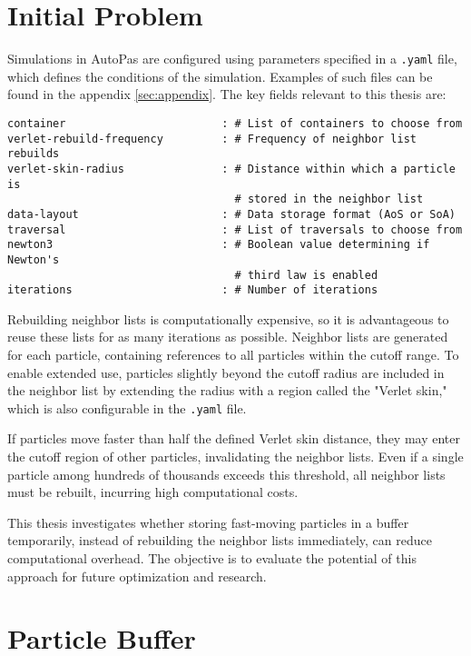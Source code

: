 \section{Initial Problem}
Simulations in AutoPas are configured using parameters specified in a \texttt{.yaml} file, which defines the conditions of the simulation. Examples of such files can be found in the appendix \ref{sec:appendix}. The key fields relevant to this thesis are:

\begin{verbatim}
container                        : # List of containers to choose from
verlet-rebuild-frequency         : # Frequency of neighbor list rebuilds
verlet-skin-radius               : # Distance within which a particle is 
                                   # stored in the neighbor list
data-layout                      : # Data storage format (AoS or SoA)
traversal                        : # List of traversals to choose from
newton3                          : # Boolean value determining if Newton's 
                                   # third law is enabled
iterations                       : # Number of iterations
\end{verbatim}

Rebuilding neighbor lists is computationally expensive, so it is advantageous to reuse these lists for as many iterations as possible. Neighbor lists are generated for each particle, containing references to all particles within the cutoff range. To enable extended use, particles slightly beyond the cutoff radius are included in the neighbor list by extending the radius with a region called the "Verlet skin," which is also configurable in the 	\texttt{.yaml} file.

If particles move faster than half the defined Verlet skin distance, they may enter the cutoff region of other particles, invalidating the neighbor lists. Even if a single particle among hundreds of thousands exceeds this threshold, all neighbor lists must be rebuilt, incurring high computational costs. 

This thesis investigates whether storing fast-moving particles in a buffer temporarily, instead of rebuilding the neighbor lists immediately, can reduce computational overhead. The objective is to evaluate the potential of this approach for future optimization and research.

\section{Particle Buffer}

